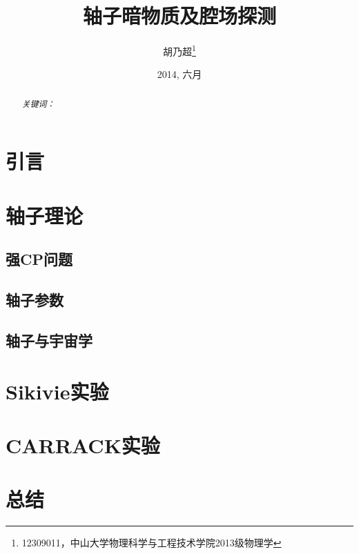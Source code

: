 \documentclass[twocolumn,12pt,a4paper]{article}
\title{轴子暗物质及腔场探测}
\author{胡乃超\thanks{12309011，中山大学物理科学与工程技术学院2013级物理学}}%
\date{2014, 六月}
\begin{document}
\maketitle
\renewcommand{\abstractname}{摘要}
\begin{abstract}
\emph{关键词：}
\end{abstract}
\renewcommand{\contentsname}{目录}
\tableofcontents
\section{引言}
\cite{Kim}
\section{轴子理论}
\subsection{强CP问题}
\subsection{轴子参数}
\subsection{轴子与宇宙学}

\section{Sikivie实验}
\section{CARRACK实验}
\section{总结}

\medskip
\renewcommand\refname{参考文献}
\printbibliography
\end{document}
